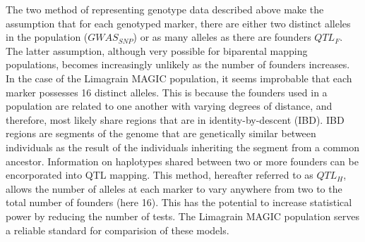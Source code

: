 \documentclass[article,9pt,twocolumn,twoside]{rilabRxiv}
\begin{document}
The two method of representing genotype data described above make the assumption that for each genotyped marker, there are either two distinct alleles in the population ($GWAS_{SNP}$) or as many alleles as there are founders $QTL_F$.
The latter assumption, although very possible for biparental mapping populations, becomes increasingly unlikely as the number of founders increases.
In the case of the Limagrain MAGIC population, it seems improbable that each marker possesses 16 distinct alleles.
This is because the founders used in a population are related to one another with varying degrees of distance, and therefore, most likely share regions that are in identity-by-descent (IBD).
IBD regions are segments of the genome that are genetically similar between individuals as the result of the individuals inheriting the segment from a common ancestor.
Information on haplotypes shared between two or more founders can be encorporated into QTL mapping.
This method, hereafter referred to as $QTL_H$, allows the number of alleles at each marker to vary anywhere from two to the total number of founders (here 16).
This has the potential to increase statistical power by reducing the number of tests.
The Limagrain MAGIC population serves a reliable standard for comparision of these models.
\end{document}
